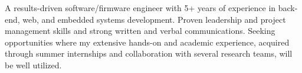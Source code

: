 \cvsummary
{
  A results-driven software/firmware engineer with 5+ years of experience in back-end, web, and embedded systems development. Proven leadership and project management skills and strong written and verbal communications. Seeking opportunities where my extensive hands-on and academic experience, acquired through summer internships and collaboration with several research teams, will be well utilized.
}